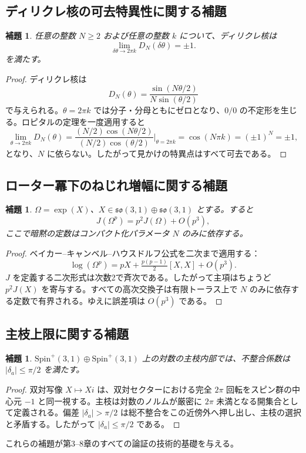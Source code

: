 \documentclass[a4paper]{article}
\newtheorem{lemma}[theorem]{補題}
\theoremstyle{definition}
\begin{document}
\subsection{ディリクレ核の可去特異性に関する補題}

\begin{lemma}
任意の整数 $N \geq 2$ および任意の整数 $k$ について、ディリクレ核は
\[
\lim_{\delta\theta \to 2\pi k} D_N(\delta\theta) = \pm 1.
\]
を満たす。
\end{lemma}

\begin{proof}
ディリクレ核は
\[
D_N(\theta) = \frac{\sin(N\theta/2)}{N\sin(\theta/2)}
\]
で与えられる。$\theta = 2\pi k$ では分子・分母ともにゼロとなり、$0/0$ の不定形を生じる。ロピタルの定理を一度適用すると
\[
\lim_{\theta \to 2\pi k} D_N(\theta) = \frac{(N/2)\cos(N\theta/2)}{(N/2)\cos(\theta/2)} \Big|_{\theta=2\pi k} = \cos(N\pi k) = (\pm 1)^N = \pm 1,
\]
となり、$N$ に依らない。したがって見かけの特異点はすべて可去である。
\end{proof}

\subsection{ローター冪下のねじれ増幅に関する補題}

\begin{lemma}
$\Omega = \exp(X)$、$X \in \mathfrak{so}(3,1) \oplus \mathfrak{so}(3,1)$ とする。すると
\[
J(\Omega^p) = p^2 J(\Omega) + O(p^3),
\]
ここで暗黙の定数はコンパクト化パラメータ $N$ のみに依存する。
\end{lemma}

\begin{proof}
ベイカー--キャンベル--ハウスドルフ公式を二次まで適用する：
\[
\log(\Omega^p) = pX + \tfrac{p(p-1)}{2}[X,X] + O(p^3).
\]
$J$ を定義する二次形式は次数2で斉次である。したがって主項はちょうど $p^2 J(X)$ を寄与する。すべての高次交換子は有限トーラス上で $N$ のみに依存する定数で有界される。ゆえに誤差項は $O(p^3)$ である。
\end{proof}

\subsection{主枝上限に関する補題}

\begin{lemma}
$\mathrm{Spin}^+(3,1) \oplus \mathrm{Spin}^+(3,1)$ 上の対数の主枝内部では、不整合係数は $|\delta_a| \leq \pi/2$ を満たす。
\end{lemma}

\begin{proof}
双対写像 $X \mapsto Xi$ は、双対セクターにおける完全 $2\pi$ 回転をスピン群の中心元 $-1$ と同一視する。主枝は対数のノルムが厳密に $2\pi$ 未満となる開集合として定義される。偏差 $|\delta_a| > \pi/2$ は総不整合をこの近傍外へ押し出し、主枝の選択と矛盾する。したがって $|\delta_a| \leq \pi/2$ である。
\end{proof}

これらの補題が第3--8章のすべての論証の技術的基礎を与える。
\end{document}
